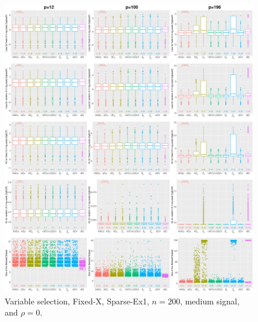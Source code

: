 \begin{figure}[!ht]
\centering
\includegraphics[width=\textwidth]{figures/supplement/fixedx/subset_selection/Sparse-Ex1_n200_msnr_rho0.eps}
\caption{Variable selection, Fixed-X, Sparse-Ex1, $n=200$, medium signal, and $\rho=0$.}
\end{figure}
\clearpage
